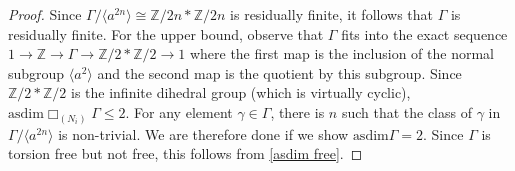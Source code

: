 \documentclass[12pt]{article}
\newcommand{\asdim}{\text{asdim}}
\newcommand{\Z}{\mathbb{Z}}
\begin{document}
{\begin{proof}
Since $\Gamma/\langle a^{2n}\rangle\cong \Z/2n*\Z/2n$ is residually finite, it follows that $\Gamma$ is residually finite. For the upper bound, observe that $\Gamma$ fits into the exact sequence $1\to \Z\to \Gamma\to \Z/2*\Z/2\to 1$ where the first map is the inclusion of the normal subgroup $\langle a^2\rangle$ and the second map is the quotient by this subgroup.  Since $\Z/2*\Z/2$ is the infinite dihedral group (which is virtually cyclic), $\asdim \Box_{(N_i)}\Gamma \leq 2$.  For any element $\gamma\in \Gamma$, there is $n$ such that the class of $\gamma$ in $\Gamma/\langle a^{2n}\rangle$ is non-trivial.   We are therefore done if we show $\asdim \Gamma = 2$.  Since $\Gamma$ is torsion free but not free, this follows from \ref{asdim free}.  \end{proof}

%
%


}
\end{document}

